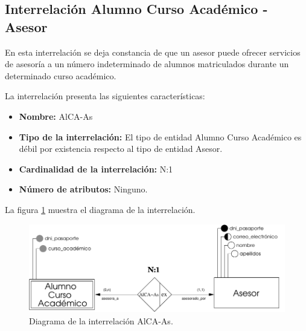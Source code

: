 \subsection{Interrelación Alumno Curso Académico - Asesor}

   \begin{description}
      \item[Definición] En esta interrelación se deja constancia de que un
      asesor puede ofrecer servicios de asesoría a un número indeterminado
      de alumnos matriculados durante un determinado curso académico.

      \item[Características] La interrelación presenta las siguientes
                             características:

         \begin{itemize}
            \item \textbf{Nombre:} AlCA-As
            \item \textbf{Tipo de la interrelación:} El tipo de entidad
                  Alumno Curso Académico es débil por existencia respecto al
                  tipo de entidad Asesor.
            \item \textbf{Cardinalidad de la interrelación:} N:1
            \item \textbf{Número de atributos:} Ninguno.
         \end{itemize}

      \item[Diagrama] La figura \ref{diagramaAlCA-As} muestra el diagrama de la
                      interrelación.

      \item \begin{figure}[!ht]
            \begin{center}
            \includegraphics[]{07.Modelo_Entidad-Interrelacion/7.3.Analisis_Interrelaciones/diagramas/AlCA-As.pdf}
            \caption{Diagrama de la interrelación AlCA-As.}
            \label{diagramaAlCA-As}
            \end{center}
         \end{figure}


\end{description}
